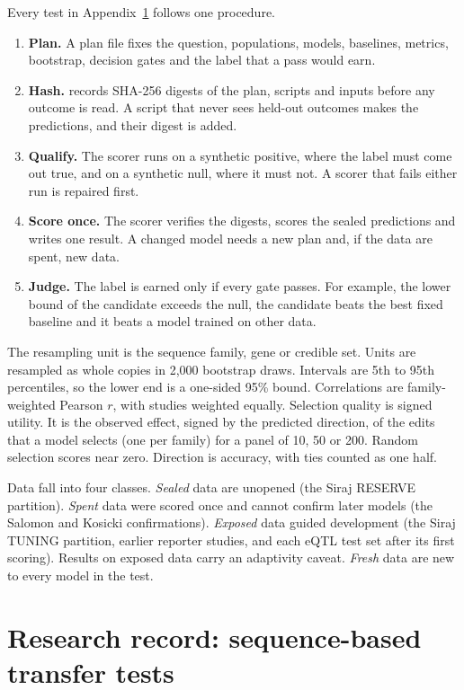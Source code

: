 \documentclass[10.5pt,a4paper]{article}
\begin{document}
Every test in Appendix~\ref{app:record} follows one procedure.
\begin{enumerate}
\item \textbf{Plan.} A plan file fixes the question, populations, models, baselines, metrics, bootstrap, decision gates and the label that a pass would earn.
\item \textbf{Hash.}  records SHA-256 digests of the plan, scripts and inputs before any outcome is read. A script that never sees held-out outcomes makes the predictions, and their digest is added.
\item \textbf{Qualify.} The scorer runs on a synthetic positive, where the label must come out true, and on a synthetic null, where it must not. A scorer that fails either run is repaired first.
\item \textbf{Score once.} The scorer verifies the digests, scores the sealed predictions and writes one result. A changed model needs a new plan and, if the data are spent, new data.
\item \textbf{Judge.} The label is earned only if every gate passes. For example, the lower bound of the candidate exceeds the null, the candidate beats the best fixed baseline and it beats a model trained on other data.
\end{enumerate}

The resampling unit is the sequence family, gene or credible set. Units are resampled as whole copies in 2,000 bootstrap draws. Intervals are 5th to 95th percentiles, so the lower end is a one-sided 95\% bound. Correlations are family-weighted Pearson $r$, with studies weighted equally. Selection quality is signed utility. It is the observed effect, signed by the predicted direction, of the edits that a model selects (one per family) for a panel of 10, 50 or 200. Random selection scores near zero. Direction is accuracy, with ties counted as one half.

Data fall into four classes. \emph{Sealed} data are unopened (the Siraj RESERVE partition). \emph{Spent} data were scored once and cannot confirm later models (the Salomon and Kosicki confirmations). \emph{Exposed} data guided development (the Siraj TUNING partition, earlier reporter studies, and each eQTL test set after its first scoring). Results on exposed data carry an adaptivity caveat. \emph{Fresh} data are new to every model in the test.

\section{Research record: sequence-based transfer tests}\label{app:record}
\end{document}
